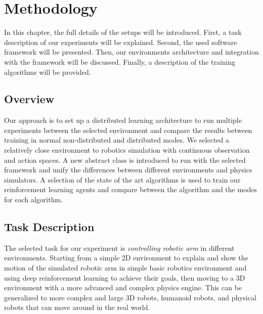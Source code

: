 
\chapter{Methodology}\label{chapter:methodology}

In this chapter, the full details of the setups will be introduced. First, a task description of our experiments will be explained. Second, the used software framework will be presented. Then, our environments architecture and integration with the framework will be discussed. Finally, a description of the training algorithms will be provided.

\section{Overview}

Our approach is to set up a distributed learning architecture to run multiple experiments between the selected environment and compare the results between training in normal non-distributed and distributed modes. We selected a relatively close environment to robotics simulation with continuous observation and action spaces. A new abstract class is introduced to run with the selected framework and unify the differences between different environments and physics simulators. A selection of the state of the art algorithms is used to train our reinforcement learning agents and compare between the algorithm and the modes for each algorithm.

\section{Task Description}

The selected task for our experiment is \textit{controlling robotic arm} in different environments. Starting from a simple 2D environment to explain and show the motion of the simulated robotic arm in simple basic robotics environment and using deep reinforcement learning to achieve their goals, then moving to a 3D environment with a more advanced and complex physics engine. This can be generalized to more complex and large 3D robots, humanoid robots, and physical robots that can move around in the real world.

